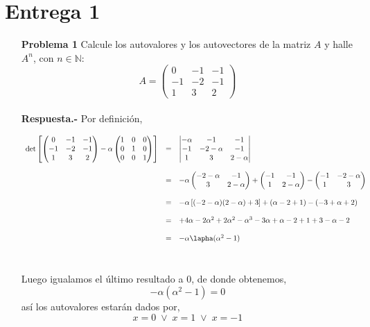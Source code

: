 \section*{\center Entrega 1}
\vspace*{1cm}

\begin{enumerate}

    \item[\bfseries Problema 1] Calcule los autovalores y los autovectores de la matriz $A$ y halle $A^n$, con $n\in \mathbb{N}:$\\

    $$A=\begin{pmatrix}
	0 & -1 & -1 \\
	-1 & -2 & -1 \\
	1 & 3 & 2 
    \end{pmatrix}$$\\
    \textbf{Respuesta.-}\;  Por definición,
    
    $$ \begin{array}{rcl} 
	\det \left[
    \begin{pmatrix}
	0 & -1 & -1 \\
	-1 & -2 & -1 \\
	1 & 3 & 2 
    \end{pmatrix} - \alpha 
    \begin{pmatrix}
	1 & 0 & 0 \\
	0 & 1 & 0 \\
	0 & 0 & 1 
\end{pmatrix} \right] & = & 
    \begin{vmatrix}
	-\alpha & -1 & -1 \\
	-1 & -2-\alpha & -1 \\
	1 & 3 & 2-\alpha 
	\end{vmatrix} \\\\ &=&  -\alpha\begin{pmatrix} -2-\alpha & -1 \\ 3 & 2-\alpha \end{pmatrix}+\begin{pmatrix}-1&-1\\ 1 & 2-\alpha\end{pmatrix} - \begin{pmatrix}-1&-2-\alpha \\ 1 & 3 \end{pmatrix}\\\\ &=&-\alpha \left[ (-2-\alpha)(2-\alpha)+3\right]+(\alpha-2+1)-(-3+\alpha+2)\\\\ &=&+4\alpha-2\alpha^2+2\alpha^2-\alpha^3-3\alpha+\alpha-2+1+3-\alpha-2\\\\ &=& -\alpha \lapha(\alpha^2-1)\\\\
    \end{array}$$\\
    Luego igualamos el último resultado a $0$, de donde obtenemos,\\
    $$-\alpha(\alpha^2-1)=0$$ 
    así los autovalores estarán dados por,
    $$x=0 \; \lor\; x=1 \;\lor\; x=-1$$


\end{enumerate}
